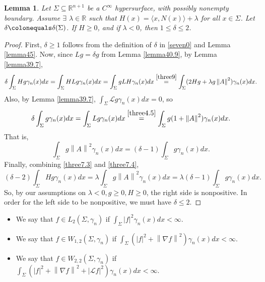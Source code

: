 \documentclass[12pt,reqno]{amsart}
\newtheorem{lemma}[theorem]{Lemma}
\theoremstyle{definition}
\renewcommand{\subset}{\subseteq}
\newcommand{\abs}[1]{\left|#1\right|}                   %
\newcommand{\vnormt}[1]{\left\|#1\right\|}    %
\newcommand{\R}{\mathbb{R}}
\newcommand{\sdimn}{n}
\newcommand{\adimn}{n+1}
\newcommand{\scon}{\lambda}
\newcommand{\pcon}{\delta}
\begin{document}
\begin{lemma}\label{lemma39}
Let $\Sigma\subset\R^{\adimn}$ be a $C^{\infty}$ hypersurface, with possibly nonempty boundary.  Assume $\exists$ $\scon\in\R$ such that $H(x)=\langle x,N(x)\rangle+\scon$ for all $x\in\Sigma$.  Let $\pcon\colonequals\pcon(\Sigma)$.  If $H\geq0$,  and if $\scon<0$, then $1\leq\pcon\leq2$.
\end{lemma}
\begin{proof}
First, $\pcon\geq1$ follows from the definition of $\pcon$ in \eqref{seven0} and Lemma \ref{lemma45}.
Now, since $Lg=\pcon g$ from Lemma \ref{lemma40.9}, by Lemma \ref{lemma39.7},
\begin{equation}\label{three7.3}
\pcon\int_{\Sigma}Hg\gamma_{\sdimn}(x)dx=\int_{\Sigma}HLg\gamma_{\sdimn}(x)dx=\int_{\Sigma}gLH\gamma_{\sdimn}(x)dx
\stackrel{\eqref{three9}}{=}\int_{\Sigma}(2Hg+\scon g\vnormt{A}^{2})\gamma_{\sdimn}(x)dx.
\end{equation}
Also, by Lemma \ref{lemma39.7}, $\int_{\Sigma}\mathcal{L}g\gamma_{\sdimn}(x)dx=0$, so
$$\pcon\int_{\Sigma}g\gamma_{\sdimn}(x)dx=\int_{\Sigma}Lg\gamma_{\sdimn}(x)dx\stackrel{\eqref{three4.5}}{=}\int_{\Sigma}g(1+\vnormt{A}^{2})\gamma_{\sdimn}(x)dx.$$
That is,
\begin{equation}\label{three7.4}
\int_{\Sigma}g\vnormt{A}^{2}\gamma_{\sdimn}(x)dx=(\pcon-1)\int_{\Sigma}g\gamma_{\sdimn}(x)dx.
\end{equation}
Finally, combining \eqref{three7.3} and \eqref{three7.4},
$$(\pcon-2)\int_{\Sigma} Hg\gamma_{\sdimn}(x)dx=\scon\int_{\Sigma}g\vnormt{A}^{2}\gamma_{\sdimn}(x)dx=\scon(\pcon-1)\int_{\Sigma}g\gamma_{\sdimn}(x)dx.$$
So, by our assumptions on $\scon<0,g\geq0,H\geq0$, the right side is nonpositive.  In order for the left side to be nonpositive, we must have $\pcon\leq2$.
\end{proof}

\begin{itemize}
\item We say that $f\in L_{2}(\Sigma,\gamma_{\sdimn})$ if $\int_{\Sigma}\abs{f}^{2}\gamma_{\sdimn}(x)dx<\infty$.
\item We say that $f\in W_{1,2}(\Sigma,\gamma_{\sdimn})$ if $\int_{\Sigma}(\abs{f}^{2}+\vnormt{\nabla f}^{2})\gamma_{\sdimn}(x)dx<\infty$.
\item We say that $f\in W_{2,2}(\Sigma,\gamma_{\sdimn})$ if $\int_{\Sigma}(\abs{f}^{2}+\vnormt{\nabla f}^{2}+\abs{\mathcal{L}f}^{2})\gamma_{\sdimn}(x)dx<\infty$.
\end{itemize}
\end{document}
